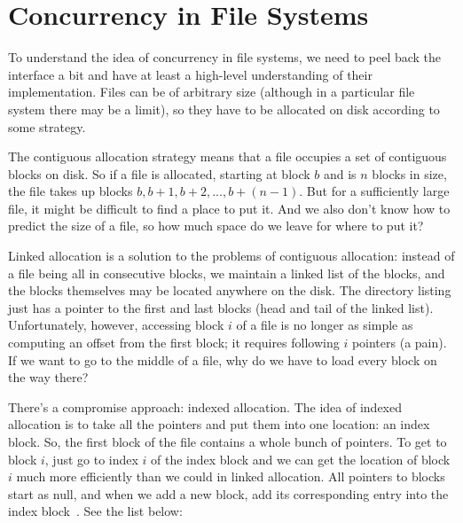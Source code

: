 




\section*{Concurrency in File Systems}

To understand the idea of concurrency in file systems, we need to peel back the interface a bit and have at least a high-level understanding of their implementation. Files can be of arbitrary size (although in a particular file system there may be a limit), so they have to be allocated on disk according to some strategy.

The contiguous allocation strategy means that a file occupies a set of contiguous blocks on disk. So if a file is allocated, starting at block $b$ and is $n$ blocks in size, the file takes up blocks $b, b+1, b+2, ..., b+(n-1)$. But for a sufficiently large file, it might be difficult to find a place to put it. And we also don't know how to predict the size of a file, so how much space do we leave for where to put it?

Linked allocation is a solution to the problems of contiguous allocation: instead of a file being all in consecutive blocks, we maintain a linked list of the blocks, and the blocks themselves may be located anywhere on the disk. The directory listing just has a pointer to the first and last blocks (head and tail of the linked list). Unfortunately, however, accessing block $i$ of a file is no longer as simple as computing an offset from the first block; it requires following $i$ pointers (a pain). If we want to go to the middle of a file, why do we have to load every block on the way there?

There's a compromise approach: indexed allocation. The idea of indexed allocation is to take all the pointers and put them into one location: an index block. So, the first block of the file contains a whole bunch of pointers. To get to block $i$, just go to index $i$ of the index block and we can get the location of block $i$ much more efficiently than we could in linked allocation. All pointers to blocks start as null, and when we add a new block, add its corresponding entry into the index block~\cite{osc}. See the list below:

